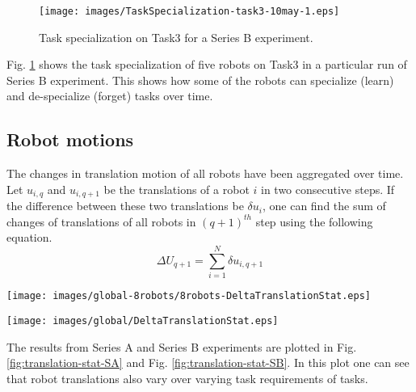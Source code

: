 \begin{figure}
\centering
\texttt{[image: images/TaskSpecialization-task3-10may-1.eps]}
\caption{Task specialization on Task3 for a Series B experiment.}
\label{fig:k-single-task-SB} 
\end{figure}
Fig. \ref{fig:k-single-task-SB} shows the task specialization of five robots on Task3 in a particular run of Series B experiment. This shows how some of the robots can specialize (learn) and de-specialize (forget) tasks over time.
\subsection*{Robot motions}
The changes in translation motion of all robots  have been aggregated over time. Let $u_{i,q}$ and $u_{i,q+1}$ be the translations of a robot $i$ in two consecutive steps. If the difference between these two translations be $\delta u_{i}$, one can find the sum of changes of translations of all robots in $(q+1)^{th}$ step using the following equation.
\begin{equation}
\Delta U_{q+1} = \sum_{i=1}^{N} \delta u_{i, q+1} 
\label{eqn:Delta-Tr}
\end{equation}
\begin{figure*}
\centering
\texttt{[image: images/global-8robots/8robots-DeltaTranslationStat.eps]}
\caption{\small Sum of the translations of robots in Series A experiments}
\label{fig:translation-stat-SA} %
\centering
\texttt{[image: images/global/DeltaTranslationStat.eps]}
\caption{\small Sum of the translations of robots in Series B experiments}
\label{fig:translation-stat-SB} %
\end{figure*}
The results from Series A and Series B experiments are plotted in Fig. \ref{fig:translation-stat-SA} and Fig. \ref{fig:translation-stat-SB}. In this plot one can see that robot translations also vary over varying task requirements of tasks.
